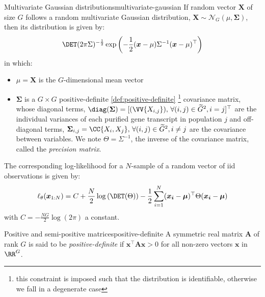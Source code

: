 \begin{Definition}{Multivariate Gaussian distributions}{multivariate-gaussian}
If random vector $\boldsymbol{X}$ of size $G$ follows a random multivariate Gaussian distribution, $\boldsymbol{X} \sim \mathcal{N}_G(\mu, \boldsymbol{\Sigma})$, then its distribution is given by:
\begin{equation*}
    \DET(2\pi\Sigma)^{-\frac{1}{2}} \exp\left( -\frac{1}{2} (\boldsymbol{x} - \mu) \Sigma^{-1} (\boldsymbol{x} - \mu)^\top\right)
\end{equation*}
in which:
\begin{itemize}
    \item $\mu=\boldsymbol{X}$ is the $G$-dimensional mean vector
    \item $\boldsymbol{\Sigma}$ is a $G\times G$ positive-definite \cref{def:positive-definite} \footnote{this constraint is imposed such that the distribution is identifiable, otherwise we fall in a degenerate case} covariance matrix, whose diagonal terms, $\diag(\boldsymbol{\Sigma})=[(\VV{X_{i,j}}), \, \forall (i, j) \in \widetilde{G}^2, i= j]^\top$ are the individual variances of each purified gene transcript in population $j$ and off-diagonal terms, $\boldsymbol{\Sigma}_{i,j}=\CC{X_{i}, X_{j}}, \, \forall (i, j) \in \widetilde{G}^2, i \neq j$ are the covariance between variables. We note $\Theta=\Sigma^{-1}$, the inverse of the covariance matrix, called the \textit{precision matrix}.
\end{itemize}

The corresponding log-likelihood for a $N$-sample of a random vector of iid observations is given by:
\begin{equation}
    \label{eq:loglikelihood-multivariate-gaussian}
    \ell_{\theta}(\boldsymbol{x}_{1:N})=C + \frac{N}{2} \log\left(\DET(\Theta)\right) - \frac{1}{2} \sum_{i=1}^N (\boldsymbol{x_i} - \boldsymbol{\mu})^\top \Theta (\boldsymbol{x_i} - \boldsymbol{\mu})
\end{equation}
with $C=-\frac{NG}{2}\log(2\pi)$ a constant.

\end{Definition}

\begin{Definition}{Positive and semi-positive matrices}{positive-definite}
A symmetric real matrix $\boldsymbol{A}$ of rank $G$ is said to be \textit{positive-definite} if $\boldsymbol{x}^\top \boldsymbol{A} \boldsymbol{x} > 0$ for all non-zero vectors $\boldsymbol{x}$ in $\RR^G$.
\end{Definition}

